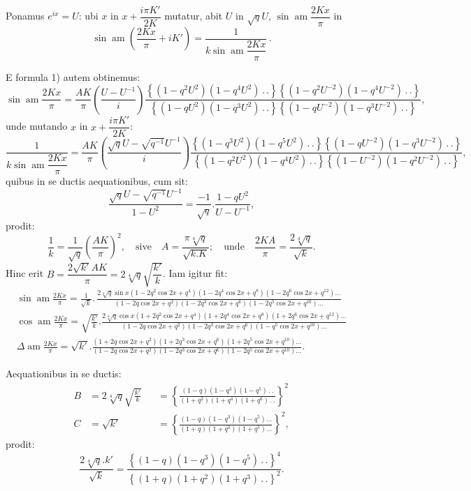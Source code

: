 \documentclass{article}
\begin{document}
Ponamus $e^{ix}=U$: ubi $x$ in $x+\dfrac{i\pi K'}{2K}$ mutatur, abit $U$ in $\sqrt{q}U$, $\sin\operatorname{am}\dfrac{2Kx}{\pi}$ in
\[
\sin\operatorname{am}\left(\frac{2Kx}{\pi}+iK'\right)=\frac{1}{k\sin\operatorname{am}\dfrac{2Kx}{\pi}}\,.
\]

E formula 1) autem obtinemus:
\[
\sin\operatorname{am}\frac{2Kx}{\pi}=\frac{AK}{\pi}\left(\frac{U-U^{-1}}{i}\right)\frac{\left\{(1-q^{2}U^{2})(1-q^{4}U^{2})\,.\,.\right\}\left\{(1-q^{2}U^{-2})(1-q^{4}U^{-2})\,.\,.\right\}}{\left\{(1-qU^{2})(1-q^{3}U^{2})\,.\,.\right\}\left\{(1-qU^{-2})(1-q^{3}U^{-2})\,.\,.\right\}},
\]
unde mutando $x$ in $x+\dfrac{i\pi K'}{2K}$:
\[
\frac{1}{k\sin\operatorname{am}\dfrac{2Kx}{\pi}}=\frac{AK}{\pi}\left(\frac{\sqrt{q}U-\sqrt{q^{-1}}U^{-1}}{i}\right)\frac{\left\{(1-q^{3}U^{2})(1-q^{5}U^{2})\,.\,.\right\}\left\{(1-qU^{-2})(1-q^{3}U^{-2})\,.\,.\right\}}{\left\{(1-q^{2}U^{2})(1-q^{4}U^{2})\,.\,.\right\}\left\{(1-U^{-2})(1-q^{2}U^{-2})\,.\,.\right\}},
\]
quibus in se ductis aequationibus, cum sit:
\[
\frac{\sqrt{q}U-\sqrt{q^{-1}}U^{-1}}{1-U^{2}}=\frac{-1}{\sqrt{q}}.\frac{1-qU^{2}}{U-U^{-1}},
\]
prodit:
\[
\frac{1}{k}=\frac{1}{\sqrt{q}}\left(\frac{AK}{\pi}\right)^{2},\quad\text{sive}\quad A=\frac{\pi\sqrt[4]{q}}{\sqrt{k.K}};\quad\text{unde}\quad\frac{2KA}{\pi}=\frac{2\sqrt[4]{q}}{\sqrt{k}}.
\]
Hinc erit $B=\dfrac{2\sqrt{k'}AK}{\pi}=2\sqrt[4]{q}\sqrt{\dfrac{k'}{k}}$. Iam igitur fit:
\[
\begin{gathered}
\sin\operatorname{am}\frac{2Kx}{\pi}=\frac{1}{\sqrt{k}}.\,\frac{2\sqrt[4]{q}\sin x(1-2q^{2}\cos 2x+q^{4})(1-2q^{4}\cos 2x+q^{8})(1-2q^{6}\cos 2x+q^{12})\ldots}{(1-2q\cos 2x+q^{2})(1-2q^{3}\cos 2x+q^{6})(1-2q^{5}\cos 2x+q^{10})\ldots}
\\[2ex]
\cos\operatorname{am}\frac{2Kx}{\pi}=\sqrt{\frac{k'}{k}}.\frac{2\sqrt[4]{q}\cos x(1+2q^{2}\cos 2x+q^{4})(1+2q^{4}\cos 2x+q^{8})(1+2q^{6}\cos 2x+q^{12})\ldots}{(1-2q\cos 2x+q^{2})(1-2q^{3}\cos 2x+q^{6})(1-q^{5}\cos 2x+q^{10})\ldots}
\\[2ex]
\Delta\operatorname{am}\frac{2Kx}{\pi}=\sqrt{k'}.\frac{(1+2q\cos 2x+q^{2})(1+2q^{3}\cos 2x+q^{6})(1+2q^{5}\cos 2x+q^{10})\ldots}{(1-2q\cos 2x+q^{2})(1-2q^{3}\cos 2x+q^{6})(1-2q^{5}\cos 2x+q^{10})\ldots}.
\end{gathered}
\]

Aequationibus in se ductis:
\[
\begin{aligned}
B&=2\sqrt[4]{q}\sqrt{\frac{k'}{k}}&&=\left\{\frac{(1-q)(1-q^{3})(1-q^{5})\,.\,.}{(1+q^{2})(1+q^{4})(1+q^{6})\,.\,.}\right\}^{2}\\[2ex]
C&=\sqrt{k'}&&=\left\{\frac{(1-q)(1-q^{3})(1-q^{5})\ldots}{(1+q)(1+q^{3})(1+q^{5})\ldots}\right\}^{2},
\end{aligned}
\]
prodit:
\[
\frac{2\sqrt[4]{q}.k'}{\sqrt{k}}=\frac{\left\{(1-q)(1-q^{3})(1-q^{5})\,.\,.\right\}^{4}}{\left\{(1+q)(1+q^{2})(1+q^{3})\,.\,.\right\}^{2}}.
\]
\end{document}
